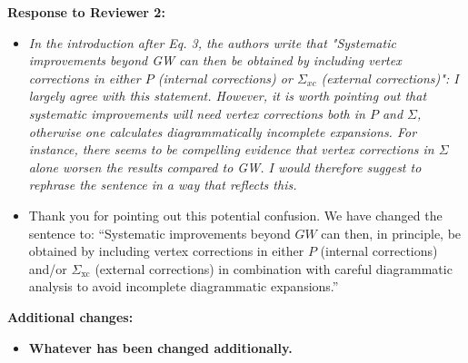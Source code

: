 \documentclass[10pt]{uhhlet}
\begin{document}
{\large \bf Response to Reviewer 2:}
\begin{itemize}
  \item \textit{In the introduction after Eq. 3, the authors write that "Systematic improvements beyond GW can then be obtained by including vertex corrections in either $P$ (internal corrections) or $\Sigma_{xc}$ (external corrections)": I largely agree with this statement. However, it is worth pointing out that systematic improvements will need vertex corrections both in $P$ and $\Sigma$, otherwise one calculates diagrammatically incomplete expansions. For instance, there seems to be compelling evidence that vertex corrections in $\Sigma$ alone worsen the results compared to GW. I would therefore suggest to rephrase the sentence in a way that reflects this.}
  
  \item[] Thank you for pointing out this potential confusion.
  We have changed the sentence to: ``Systematic improvements beyond $GW$ can then, in principle, be obtained by including vertex corrections in either $P$ (internal corrections) and/or $\Sigma_\text{xc}$ (external corrections) in combination with careful diagrammatic analysis to avoid incomplete diagrammatic expansions.''
\end{itemize}

{\large \bf Additional changes:}

\begin{itemize}
  \item[] \textbf{Whatever has been changed additionally.}
\end{itemize}
\end{document}
